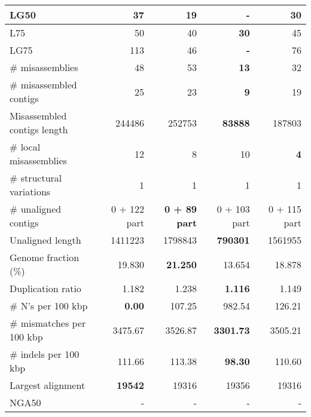 \documentclass[12pt,a4paper]{article}
\begin{document}
\begin{table}[ht]
\begin{center}
\begin{tabular}{|l*{4}{|r}|}
LG50 & 37 & 19 & {\bf -} & 30 \\ \hline
L75 & 50 & 40 & {\bf 30} & 45 \\ \hline
LG75 & 113 & 46 & {\bf -} & 76 \\ \hline
\# misassemblies & 48 & 53 & {\bf 13} & 32 \\ \hline
\# misassembled contigs & 25 & 23 & {\bf 9} & 19 \\ \hline
Misassembled contigs length & 244486 & 252753 & {\bf 83888} & 187803 \\ \hline
\# local misassemblies & 12 & 8 & 10 & {\bf 4} \\ \hline
\# structural variations & 1 & 1 & 1 & 1 \\ \hline
\# unaligned contigs & 0 + 122 part & {\bf 0 + 89 part} & 0 + 103 part & 0 + 115 part \\ \hline
Unaligned length & 1411223 & 1798843 & {\bf 790301} & 1561955 \\ \hline
Genome fraction (\%) & 19.830 & {\bf 21.250} & 13.654 & 18.878 \\ \hline
Duplication ratio & 1.182 & 1.238 & {\bf 1.116} & 1.149 \\ \hline
\# N's per 100 kbp & {\bf 0.00} & 107.25 & 982.54 & 126.21 \\ \hline
\# mismatches per 100 kbp & 3475.67 & 3526.87 & {\bf 3301.73} & 3505.21 \\ \hline
\# indels per 100 kbp & 111.66 & 113.38 & {\bf 98.30} & 110.60 \\ \hline
Largest alignment & {\bf 19542} & 19316 & 19356 & 19316 \\ \hline
NGA50 & - & - & - & - \\ \hline
\end{tabular}
\end{center}
\end{table}
\end{document}
